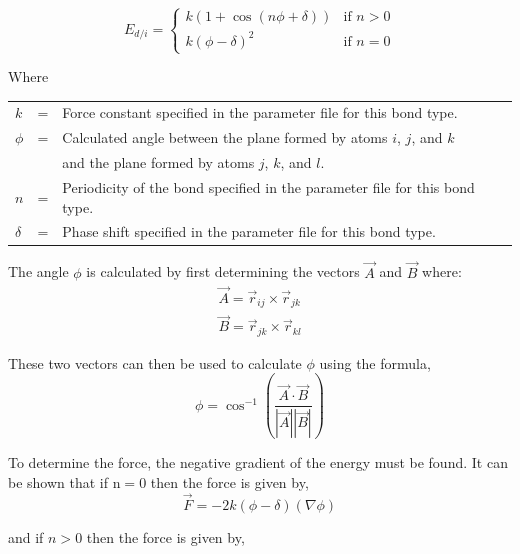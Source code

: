 \documentclass[11pt]{report}
\newcommand{\Vr}[1]{\mbox{$\vec{r}_{#1}$}}
\begin{document}
\begin{appendix}
\begin{equation}
  E_{d/i} = \left\{ \begin{array}{ll}
         k \left( 1 + \cos(n \phi + \delta) \right) & \mbox{if $n > 0$} \\
         k \left( \phi - \delta \right)^2          & \mbox{if $n = 0$} 
                    \end{array}
            \right.
\end{equation}

\noindent
Where\\
\begin{tabular}{lcl}
 $k$ & = & Force constant specified in the parameter file for this bond type.\\
 $\phi$ & = &  Calculated angle between the plane formed by atoms $i$, $j$, and $k$ \\
        &   &  and the plane formed by atoms $j$, $k$, and $l$.\\
$n$ & = & Periodicity of the bond specified in the parameter file for this bond type.\\
  $\delta$ & = & Phase shift specified in the parameter file for this bond type.\\
\end{tabular}

\noindent
The angle $\phi$ is calculated by first determining the vectors $\vec{A}$ and $\vec{B}$ where:
\begin{eqnarray*}
  \vec{A} = \Vr{ij} \times \Vr{jk}   \\
  \vec{B} = \Vr{jk} \times \Vr{kl}
\end{eqnarray*}

\noindent
These two vectors can then be used to calculate $\phi$ using the formula,\\

\begin{equation}
  \phi =  \cos^{-1} \left( \frac{ \vec{A} \cdot \vec{B} }{ |\vec{A}| |\vec{B}| } \right)
\end{equation}

\noindent
To determine the force, the negative gradient of the energy must be
found.  It can  be shown that if n$=$0 then the force is given by,
\begin{equation}
  \vec{F} = - 2k \left( \phi - \delta \right) \left( \nabla \phi \right)
\end{equation}

\noindent
and if $n>0$ then the force is given by,\\


\end{appendix}
\end{document}
